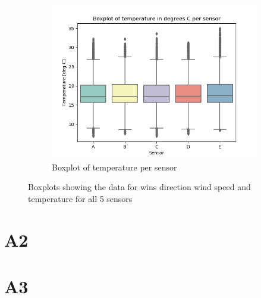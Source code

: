 \documentclass[whitelogo]{tudelft-report}
\begin{document}
\begin{figure}[h!]
\begin{subfigure}[b]{0.4\linewidth}
    \includegraphics[width=\linewidth]{Boxplot of temperature per sensor.png}
    \caption{Boxplot of temperature per sensor}
  \end{subfigure}
  \caption{Boxplots showing the data for wins direction wind speed and temperature for all 5 sensors}
  \label{fig:boxplots}
\end{figure}





\section {A2}


\section {A3}


%

\appendix

%


\end{document}
